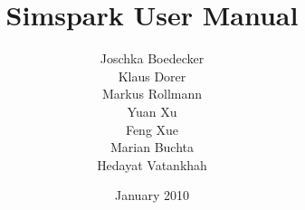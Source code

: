 

\author{Joschka Boedecker \\ Klaus Dorer \\ Markus Rollmann \\ Yuan Xu
\\ Feng Xue \\ Marian Buchta \\ Hedayat Vatankhah}
\title{Simspark User Manual}

\date{January 2010}



\maketitle
\cleardoublepage
\pagestyle{fancy}


\setlength{\headheight}{14pt}
\setlength{\parindent}{0.7cm}

\frontmatter
\tableofcontents
\mainmatter












\backmatter




\printindex 


